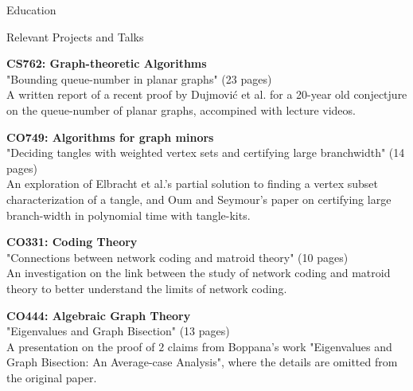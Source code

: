 \documentclass{cv}
\begin{document}
\begin{rSection}{Education}
\begin{rSubsection}{Relevant Projects and Talks}{}{}{}
	\item \textbf{CS762: Graph-theoretic Algorithms} \\
	"Bounding queue-number in planar graphs" (23 pages) \\
	A written report of a recent proof by Dujmovi\'{c} et al. for a 20-year old conjectjure on the queue-number of planar graphs, 
	accompined with lecture videos.
	\item \textbf{CO749: Algorithms for graph minors} \\
	"Deciding tangles with weighted vertex sets and certifying large branchwidth" (14 pages) \\
	An exploration of Elbracht et al.'s partial solution to finding a vertex subset characterization of a tangle, 
	and Oum and Seymour's paper on certifying large branch-width in polynomial time with tangle-kits.
	\item \textbf{CO331: Coding Theory} \\
	"Connections between network coding and matroid theory" (10 pages) \\
	An investigation on the link between the study of network coding and matroid theory 
	to better understand the limits of network coding.
	\item \textbf{CO444: Algebraic Graph Theory} \\
	"Eigenvalues and Graph Bisection" (13 pages) \\
	A presentation on the proof of $2$ claims from Boppana's work "Eigenvalues and Graph Bisection: An Average-case Analysis", 
	where the details are omitted from the original paper.
\end{rSubsection}
\end{rSection}
\end{document}
